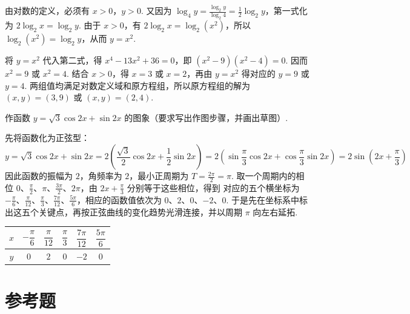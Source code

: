 \begin{solution}
由对数的定义，必须有 \(x>0\)，\(y>0\). 又因为 \(\log_4 y=\frac{\log_2 y}{\log_2 4}=\frac{1}{2}\log_2 y\)，第一式化为 \(2\log_2 x=\log_2 y\). 由于 \(x>0\)，有 \(2\log_2 x=\log_2\left(x^2\right)\)，所以 \(\log_2\left(x^2\right)=\log_2 y\)，从而 \(y=x^2\).

将 \(y=x^2\) 代入第二式，得 \(x^4-13x^2+36=0\)，即 \(\left(x^2-9\right)\left(x^2-4\right)=0\). 因而 \(x^2=9\) 或 \(x^2=4\). 结合 \(x>0\)，得 \(x=3\) 或 \(x=2\)，再由 \(y=x^2\) 得对应的 \(y=9\) 或 \(y=4\). 两组值均满足对数定义域和原方程组，所以原方程组的解为 \(\left(x,y\right)=\left(3,9\right)\) 或 \(\left(x,y\right)=\left(2,4\right)\).
\end{solution}

\begin{problem}
作函数 \(y=\sqrt{3}\cos2x+\sin2x\) 的图象（要求写出作图步骤，并画出草图）.
\end{problem}

\begin{solution}
先将函数化为正弦型：
\[
y=\sqrt{3}\cos2x+\sin2x=2\left(\frac{\sqrt{3}}{2}\cos2x+\frac{1}{2}\sin2x\right)=2\left(\sin\frac{\pi}{3}\cos2x+\cos\frac{\pi}{3}\sin2x\right)=2\sin\left(2x+\frac{\pi}{3}\right)
\]
因此函数的振幅为 \(2\)，角频率为 \(2\)，最小正周期为 \(T=\frac{2\pi}{2}=\pi\). 取一个周期内的相位 \(0\)、\(\frac{\pi}{2}\)、\(\pi\)、\(\frac{3\pi}{2}\)、\(2\pi\)，由 \(2x+\frac{\pi}{3}\) 分别等于这些相位，得到
对应的五个横坐标为 \(-\frac{\pi}{6}\)、\(\frac{\pi}{12}\)、\(\frac{\pi}{3}\)、\(\frac{7\pi}{12}\)、\(\frac{5\pi}{6}\)，相应的函数值依次为 \(0\)、\(2\)、\(0\)、\(-2\)、\(0\). 于是先在坐标系中标出这五个关键点，再按正弦曲线的变化趋势光滑连接，并以周期 \(\pi\) 向左右延拓.

\begin{center}
\begin{tabular}{c|ccccc}
\hline
\(x\) & \(-\dfrac{\pi}{6}\) & \(\dfrac{\pi}{12}\) & \(\dfrac{\pi}{3}\) & \(\dfrac{7\pi}{12}\) & \(\dfrac{5\pi}{6}\) \\
\hline
\(y\) & \(0\) & \(2\) & \(0\) & \(-2\) & \(0\) \\
\hline
\end{tabular}
\end{center}

\end{solution}

\section{参考题}

